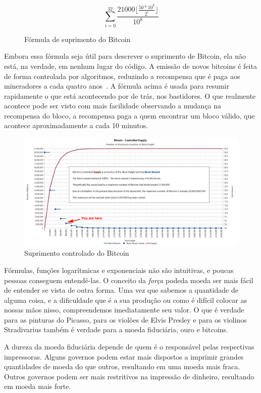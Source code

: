 \begin{figure}
  \centering
  \begin{equation}
  \sum\limits_{i=0}^{32} \frac{21000 \lfloor \frac{50*10^8}{2^i} \rfloor}{10^8}
  \end{equation}
  \caption{Fórmula de suprimento do Bitcoin}
  \label{fig:supply-formula-white}
\end{figure}

Embora essa fórmula seja útil para descrever o suprimento de Bitcoin, ela não está, na verdade, em nenhum lugar do código. A emissão de novos bitcoins é feita de forma controlada por algoritmos, reduzindo a recompensa que é paga aos mineradores a cada quatro anos~\cite {btcwiki:supply}. A fórmula acima é usada para resumir rapidamente o que está acontecendo por de trás, nos bastidores. O que realmente acontece pode ser visto com mais facilidade observando a mudança na recompensa do bloco, a recompensa paga a quem encontrar um bloco válido, que acontece aproximadamente a cada 10 minutos.

\begin{figure}
  \includegraphics{assets/images/you-are-here.png}
  \caption{Suprimento controlado do Bitcoin}
  \label{fig:you-are-here.png}
\end{figure}

Fórmulas, funções logarítmicas e exponenciais não são intuitivas, e poucas pessoas conseguem entendê-las. O conceito da \textit{força} podeda moeda  ser mais fácil de entender se vista de outra forma. Uma vez que sabemos a quantidade de alguma coisa, e a dificuldade que é a sua produção ou como é difícil colocar as nossas mãos nisso, compreendemos imediatamente seu valor. O que é verdade para as pinturas do Picasso, para os violões de Elvis Presley e para os violinos Stradivarius também é verdade para a moeda fiduciária, ouro e bitcoins.

A dureza da moeda fiduciária depende de quem é o responsável pelas respectivas impressoras. Alguns governos podem estar mais dispostos a imprimir grandes quantidades de moeda do que outros, resultando em uma moeda mais fraca. Outros governos podem ser mais restritivos na impressão de dinheiro, resultando em moeda mais forte.

